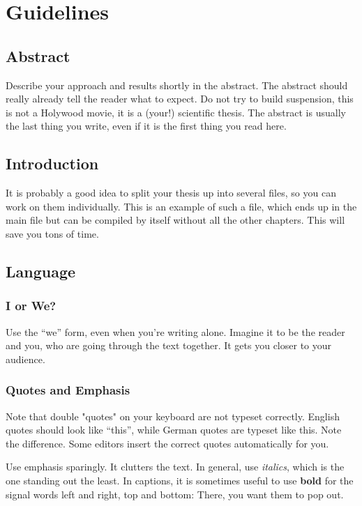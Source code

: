 \documentclass[{{cookiecutter.project_slug}}.tex]{subfiles}
\begin{document}
\part*{Guidelines}
\chapter*{Abstract}
\thispagestyle{empty}
Describe your approach and results shortly in the abstract.
The abstract should really already tell the reader what to expect.
Do not try to  build suspension, this is not a Holywood  movie, it is a
(your!) scientific thesis.  The abstract  is usually the last thing you
write, even if it is the first thing you read here.

\setcounter{chapter}{1}
\chapter{Introduction}
\label{chap:Introduction}

    It is probably a  good idea to split your thesis up  into several files, so
    you can  work on  them individually.  This  is an example  of such  a file,
    which ends up  in the main file  but can be compiled by  itself without all
    the other chapters.  This will save you tons of time.

\chapter{Language}

    \section{I or We?}

    Use the ``we'' form, even when  you're writing alone.  Imagine it to be
    the reader and  you, who are going through the  text together.  It gets
    you closer to your audience.

    \section{Quotes and Emphasis}
    Note that double "quotes" on  your keyboard are not typeset correctly. 
    English  quotes should  look like  ``this'', while  German quotes  are 
    typeset  like \glqq this\grqq.   Note the  difference.  Some  editors 
    insert the correct quotes automatically for you.                       

    Use  emphasis  sparingly.  It  clutters  the  text.  In  general,  use 
    \emph{italics}, which is the one standing out the least.  In captions, 
    it is sometimes useful to use  \textbf{bold} for the signal words left 
    and right, top and bottom: There, you want them to pop out.
\end{document}
